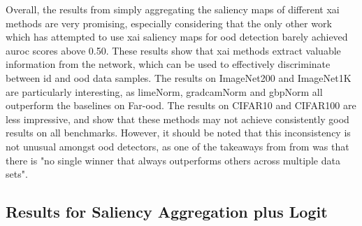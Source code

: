 \documentclass[UKenglish]{uiomasterthesis} %
\theoremstyle{definition}
\begin{document}




Overall, the results from simply aggregating the saliency maps of different \ac{xai} methods are very promising, especially considering that the only other work which has attempted to use \ac{xai} saliency maps for \ac{ood} detection barely achieved \ac{auroc} scores above 0.50. These results show that \ac{xai} methods extract valuable information from the network, which can be used to effectively discriminate between \ac{id} and \ac{ood} data samples. The results on ImageNet200 and ImageNet1K are particularly interesting, as \ac{lime}Norm, \ac{gradcam}Norm and \ac{gbp}Norm all outperform the baselines on Far-\ac{ood}. The results on CIFAR10 and CIFAR100 are less impressive, and show that these methods may not achieve consistently good results on all benchmarks. However, it should be noted that this inconsistency is not unusual amongst \ac{ood} detectors, as one of the takeaways from from \cite{openood15} was that there is "no single winner that always outperforms others across multiple data sets".

\subsection{Results for Saliency Aggregation plus Logit} \label{section:salagglogits_results}
\end{document}
